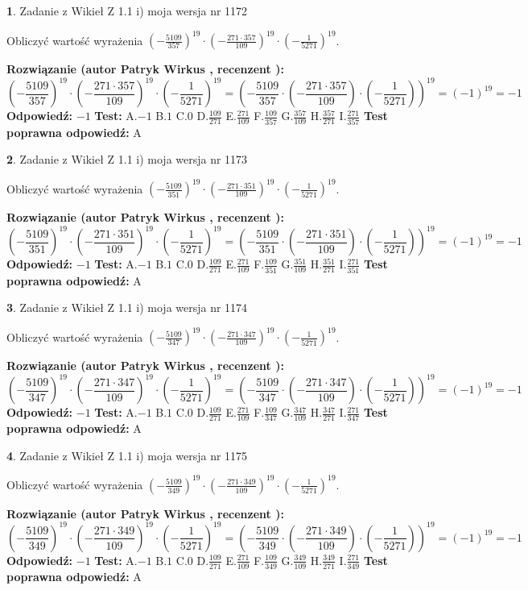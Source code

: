 \documentclass[12pt, a4paper]{article}
\theoremstyle{definition} %
\newtheorem{zad}{}
\newcommand{\zadStart}[1]{\begin{zad}#1\newline}
\newcommand{\zadStop}{\end{zad}}
\newcommand{\rozwStart}[2]{\noindent \textbf{Rozwiązanie (autor #1 , recenzent #2): }\newline}
\newcommand{\rozwStop}{\newline}
\newcommand{\odpStart}{\noindent \textbf{Odpowiedź:}\newline}
\newcommand{\odpStop}{\newline}
\newcommand{\testStart}{\noindent \textbf{Test:}\newline}
\newcommand{\testStop}{\newline}
\newcommand{\kluczStart}{\noindent \textbf{Test poprawna odpowiedź:}\newline}
\newcommand{\kluczStop}{\newline}
\begin{document}
\zadStart{Zadanie z Wikieł Z 1.1 i) moja wersja nr 1172}

Obliczyć wartość wyrażenia $(-\frac{5109}{357})^{19} \cdot (-\frac{271 \cdot 357}{109})^{19} \cdot (-\frac{1}{5271})^{19}$.
\zadStop
\rozwStart{Patryk Wirkus}{}
$$(-\frac{5109}{357})^{19} \cdot (-\frac{271 \cdot 357}{109})^{19} \cdot (-\frac{1}{5271})^{19} = (-\frac{5109}{357} \cdot (-\frac{271 \cdot 357}{109}) \cdot (-\frac{1}{5271}))^{19} = (-1)^{19} = -1$$
\rozwStop
\odpStart
$-1$
\odpStop
\testStart
A.$-1$ B.$1$ C.$0$ D.$\frac{109}{271}$ E.$\frac{271}{109}$
F.$\frac{109}{357}$ G.$\frac{357}{109}$
H.$\frac{357}{271}$
I.$\frac{271}{357}$
\testStop
\kluczStart
A
\kluczStop



\zadStart{Zadanie z Wikieł Z 1.1 i) moja wersja nr 1173}

Obliczyć wartość wyrażenia $(-\frac{5109}{351})^{19} \cdot (-\frac{271 \cdot 351}{109})^{19} \cdot (-\frac{1}{5271})^{19}$.
\zadStop
\rozwStart{Patryk Wirkus}{}
$$(-\frac{5109}{351})^{19} \cdot (-\frac{271 \cdot 351}{109})^{19} \cdot (-\frac{1}{5271})^{19} = (-\frac{5109}{351} \cdot (-\frac{271 \cdot 351}{109}) \cdot (-\frac{1}{5271}))^{19} = (-1)^{19} = -1$$
\rozwStop
\odpStart
$-1$
\odpStop
\testStart
A.$-1$ B.$1$ C.$0$ D.$\frac{109}{271}$ E.$\frac{271}{109}$
F.$\frac{109}{351}$ G.$\frac{351}{109}$
H.$\frac{351}{271}$
I.$\frac{271}{351}$
\testStop
\kluczStart
A
\kluczStop



\zadStart{Zadanie z Wikieł Z 1.1 i) moja wersja nr 1174}

Obliczyć wartość wyrażenia $(-\frac{5109}{347})^{19} \cdot (-\frac{271 \cdot 347}{109})^{19} \cdot (-\frac{1}{5271})^{19}$.
\zadStop
\rozwStart{Patryk Wirkus}{}
$$(-\frac{5109}{347})^{19} \cdot (-\frac{271 \cdot 347}{109})^{19} \cdot (-\frac{1}{5271})^{19} = (-\frac{5109}{347} \cdot (-\frac{271 \cdot 347}{109}) \cdot (-\frac{1}{5271}))^{19} = (-1)^{19} = -1$$
\rozwStop
\odpStart
$-1$
\odpStop
\testStart
A.$-1$ B.$1$ C.$0$ D.$\frac{109}{271}$ E.$\frac{271}{109}$
F.$\frac{109}{347}$ G.$\frac{347}{109}$
H.$\frac{347}{271}$
I.$\frac{271}{347}$
\testStop
\kluczStart
A
\kluczStop



\zadStart{Zadanie z Wikieł Z 1.1 i) moja wersja nr 1175}

Obliczyć wartość wyrażenia $(-\frac{5109}{349})^{19} \cdot (-\frac{271 \cdot 349}{109})^{19} \cdot (-\frac{1}{5271})^{19}$.
\zadStop
\rozwStart{Patryk Wirkus}{}
$$(-\frac{5109}{349})^{19} \cdot (-\frac{271 \cdot 349}{109})^{19} \cdot (-\frac{1}{5271})^{19} = (-\frac{5109}{349} \cdot (-\frac{271 \cdot 349}{109}) \cdot (-\frac{1}{5271}))^{19} = (-1)^{19} = -1$$
\rozwStop
\odpStart
$-1$
\odpStop
\testStart
A.$-1$ B.$1$ C.$0$ D.$\frac{109}{271}$ E.$\frac{271}{109}$
F.$\frac{109}{349}$ G.$\frac{349}{109}$
H.$\frac{349}{271}$
I.$\frac{271}{349}$
\testStop
\kluczStart
A
\kluczStop
\end{document}
